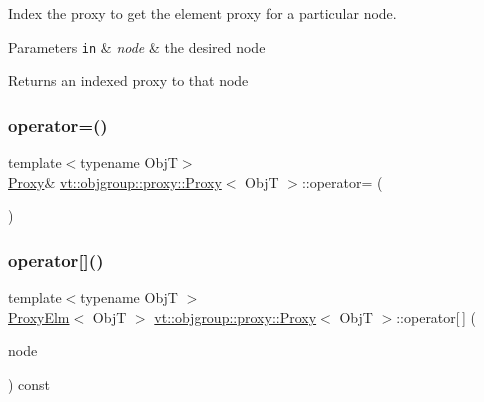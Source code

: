 Index the proxy to get the element proxy for a particular node. 


\begin{DoxyParams}[1]{Parameters}
\mbox{\tt in}  & {\em node} & the desired node\\
\hline
\end{DoxyParams}
\begin{DoxyReturn}{Returns}
an indexed proxy to that node 
\end{DoxyReturn}
\mbox{\label{structvt_1_1objgroup_1_1proxy_1_1_proxy_a2fb8dafa11b8c8f70888118bdc2f1b60}} 
\subsubsection{\texorpdfstring{operator=()}{operator=()}}
{\footnotesize\ttfamily template$<$typename ObjT$>$ \\
\hyperlink{structvt_1_1objgroup_1_1proxy_1_1_proxy}{Proxy}\& \hyperlink{structvt_1_1objgroup_1_1proxy_1_1_proxy}{vt\+::objgroup\+::proxy\+::\+Proxy}$<$ ObjT $>$\+::operator= (\begin{DoxyParamCaption}\item[{\hyperlink{structvt_1_1objgroup_1_1proxy_1_1_proxy}{Proxy}$<$ ObjT $>$ const \&}]{ }\end{DoxyParamCaption})\hspace{0.3cm}{\ttfamily [default]}}

\mbox{\label{structvt_1_1objgroup_1_1proxy_1_1_proxy_a00a267a8730fe2547776ff0136ea3895}} 
\subsubsection{\texorpdfstring{operator[]()}{operator[]()}}
{\footnotesize\ttfamily template$<$typename ObjT $>$ \\
\hyperlink{structvt_1_1objgroup_1_1proxy_1_1_proxy_elm}{Proxy\+Elm}$<$ ObjT $>$ \hyperlink{structvt_1_1objgroup_1_1proxy_1_1_proxy}{vt\+::objgroup\+::proxy\+::\+Proxy}$<$ ObjT $>$\+::operator\mbox{[}$\,$\mbox{]} (\begin{DoxyParamCaption}\item[{\hyperlink{namespacevt_a866da9d0efc19c0a1ce79e9e492f47e2}{Node\+Type}}]{node }\end{DoxyParamCaption}) const}



